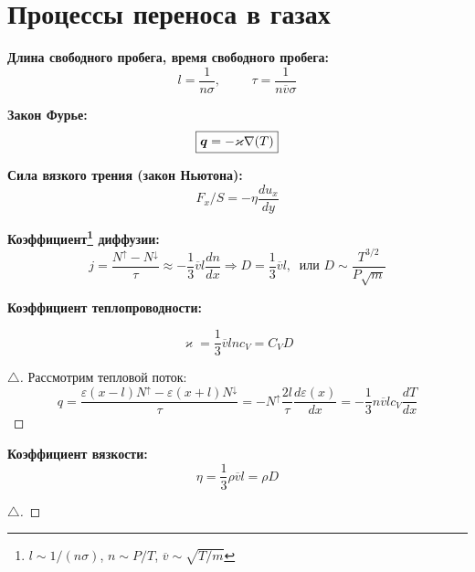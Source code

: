 \section{Процессы переноса в газах}

\noindent
\textbf{Длина свободного пробега, время свободного пробега:}
\begin{equation}
    l = \frac{1}{n \sigma}, \hspace{1cm} \tau = \frac{1}{n \overline{v} \sigma}
\end{equation}

\noindent
\textbf{Закон Фурье:}
\begin{equation}
    \boxed{\mbox{\boldmath $q$} = - \varkappa \nabla(T) }
\end{equation}

\noindent
\textbf{Сила вязкого трения (закон Ньютона):} 
\begin{equation}
    \boxed{F_x/S = - \eta \frac{du_x}{dy}}
\end{equation}

\noindent
\textbf{Коэффициент\footnote{
    $l \sim 1/(n \sigma)$, $n \sim P/T$, $\overline{v} \sim \sqrt{T/m}$
} диффузии:}
\begin{equation}
    j = \frac{N^{\uparrow} - N^{\downarrow}}{\tau} \approx - \frac{1}{3} \overline{v} l \frac{dn}{dx} \Rightarrow D = \frac{1}{3}\overline{v}l, \;\; \text{или } D \sim \frac{T^{3/2}}{P \sqrt{m}} 
\end{equation}

\noindent
\textbf{Коэффициент теплопроводности:}

\begin{equation}
    \varkappa = \frac{1}{3}\overline{v} l n c_V = C_V D
\end{equation}

\begin{proof}[$\triangle$]
Рассмотрим тепловой поток:
$$
q = \frac{\varepsilon(x-l) N^{\uparrow} - \varepsilon (x + l) N^{\downarrow}}{\tau} = - N^{\uparrow} \frac{2l}{\tau} \frac{d \varepsilon(x)}{dx} = - \frac{1}{3} n \overline{v} l c_V \frac{dT}{dx}
$$
\end{proof}

\noindent
\textbf{Коэффициент вязкости:}
\begin{equation}
    \eta = \frac{1}{3} \rho \overline{v} l = \rho D
\end{equation}

\begin{proof}[$\triangle$]
\end{proof}

